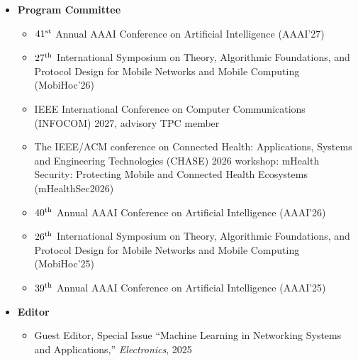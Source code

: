\documentclass[10pt,letter]{article}
\begin{document}
\begin{small}
\begin{itemize}
\begin{itemize}
        \item $10\textsuperscript{th}$ International Conference on Learning Representations (ICLR'22)
        \item $35\textsuperscript{th}$ Conference on Neural Information Processing Systems (NeurIPS'21)
        \item 2021 National Conference on Communications (NCC'21)
        \item $38\textsuperscript{th}$ International Conference on Machine Learning (ICML'21)
        \item IEEE Vehicular Technology Conference (VTC2015-Spring)
        \item IEEE International Conference on Communications (ICC'16)
    \end{itemize}

    \item \textbf{Program Committee}
    \begin{itemize}
        \item $41\textsuperscript{st}$ Annual AAAI Conference on Artificial Intelligence (AAAI'27)
        \item  $27\textsuperscript{th}$ International Symposium on Theory, Algorithmic Foundations, and Protocol Design for Mobile Networks and Mobile Computing (MobiHoc'26)
        \item IEEE International Conference on Computer Communications (INFOCOM) 2027, advisory TPC member
        \item The IEEE/ACM conference on Connected Health: Applications, Systems and Engineering Technologies (CHASE) 2026 workshop: mHealth Security: Protecting Mobile and Connected Health Ecosystems (mHealthSec2026)
        \item $40\textsuperscript{th}$ Annual AAAI Conference on Artificial Intelligence (AAAI'26)
        \item  $26\textsuperscript{th}$ International Symposium on Theory, Algorithmic Foundations, and Protocol Design for Mobile Networks and Mobile Computing (MobiHoc'25)
        \item $39\textsuperscript{th}$ Annual AAAI Conference on Artificial Intelligence (AAAI'25)
    \end{itemize}

    \item \textbf{Editor}
    \begin{itemize}
        \item Guest Editor, Special Issue ``Machine Learning in Networking Systems and Applications,'' \emph{Electronics}, 2025
    \end{itemize}
	

\end{itemize}
\end{small}
\end{document}
